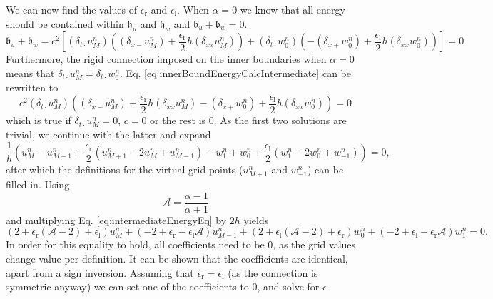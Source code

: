 \documentclass[dvipsnames]{article}
\def\Iterm{\mathcal{A}}
\begin{document}
We can now find the values of $\epsilon_\text{r}$ and $\epsilon_\text{l}$. When $\alpha = 0$ we know that all energy should be contained within $\mathfrak{h}_u$ and $\mathfrak{h}_w$ and $\mathfrak{b}_u + \mathfrak{b}_w = 0$. 
\begin{equation}\label{eq:innerBoundEnergyCalcIntermediate}
    \mathfrak{b}_u + \mathfrak{b}_w = c^2\left[(\delta_{t\cdot}u_M^n)\left((\delta_{x-}u_M^n)+\frac{\epsilon_\text{r}}{2}h(\delta_{xx}u_M^n)\right) + (\delta_{t\cdot}w_0^n)\left(-(\delta_{x+}w_0^n)+\frac{\epsilon_\text{l}}{2}h(\delta_{xx}w_0^n)\right)\right]= 0
\end{equation}
Furthermore, the rigid connection imposed on the inner boundaries when $\alpha = 0$ means that $\delta_{t\cdot}u_M^n = \delta_{t\cdot}w_0^n$. Eq. \eqref{eq:innerBoundEnergyCalcIntermediate} can be rewritten to 
\begin{equation*}
    c^2(\delta_{t\cdot}u_M^n)\left((\delta_{x-}u_M^n)+\frac{\epsilon_\text{r}}{2}h(\delta_{xx}u_M^n) -(\delta_{x+}w_0^n)+\frac{\epsilon_\text{l}}{2}h(\delta_{xx}w_0^n)\right)= 0
\end{equation*}
which is true if $\delta_{t\cdot}u_M^n=0$, $c = 0$ or the rest is $0$. As the first two solutions are trivial, we continue with the latter and expand
\begin{equation}\label{eq:intermediateEnergyEq}
    \frac{1}{h}\left(u_M^n - u_{M-1}^n +\frac{\epsilon_\text{r}}{2}(u_{M+1}^n-2u_M^n+u_{M-1}^n) -w_1^n + w_0^n + \frac{\epsilon_\text{l}}{2}(w_1^n - 2 w_0^n + w_{-1}^n) \right)= 0,
\end{equation}
after which the definitions for the virtual grid points ($u_{M+1}^n$ and $w_{-1}^n$) can be filled in. Using 
\begin{equation}
    \Iterm = \frac{\alpha - 1}{\alpha + 1}
\end{equation}
and multiplying Eq. \eqref{eq:intermediateEnergyEq} by $2h$ yields
\begin{equation}
    (2+\epsilon_\text{r}(\Iterm - 2) + \epsilon_\text{l})u_M^n + (-2 + \epsilon_\text{r} - \epsilon_\text{l}\Iterm) u_{M-1}^n + (2+\epsilon_\text{l}(\Iterm - 2) + \epsilon_\text{r})w_0^n + (-2 + \epsilon_\text{l} - \epsilon_\text{r}\Iterm) w_1^n = 0.
\end{equation}
In order for this equality to hold, all coefficients need to be 0, as the grid values change value per definition. It can be shown that the coefficients are identical, apart from a sign inversion. Assuming that $\epsilon_\text{r} = \epsilon_\text{l}$ (as the connection is symmetric anyway) we can set one of the coefficients to 0, and solve for $\epsilon$ 
\end{document}
